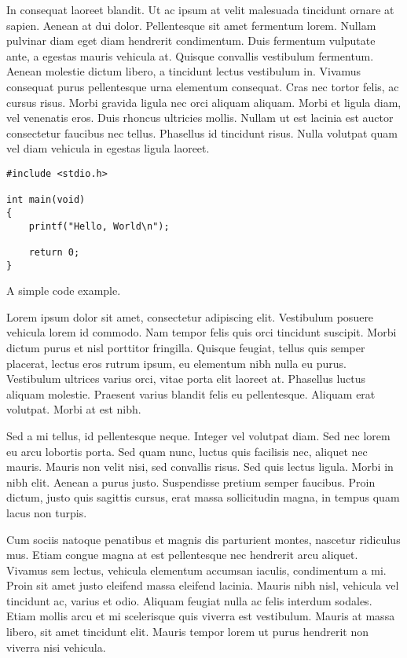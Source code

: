 In consequat laoreet blandit. Ut ac ipsum at velit malesuada tincidunt ornare at sapien. Aenean at dui dolor. Pellentesque sit amet fermentum lorem. Nullam pulvinar diam eget diam hendrerit condimentum. Duis fermentum vulputate ante, a egestas mauris vehicula at. Quisque convallis vestibulum fermentum. Aenean molestie dictum libero, a tincidunt lectus vestibulum in. Vivamus consequat purus pellentesque urna elementum consequat. Cras nec tortor felis, ac cursus risus. Morbi gravida ligula nec orci aliquam aliquam. Morbi et ligula diam, vel venenatis eros. Duis rhoncus ultricies mollis. Nullam ut est lacinia est auctor consectetur faucibus nec tellus. Phasellus id tincidunt risus. Nulla volutpat quam vel diam vehicula in egestas ligula laoreet. 

\begin{listing}[t]
\begin{lstlisting}
#include <stdio.h>

int main(void)
{
	printf("Hello, World\n");

	return 0;
}
\end{lstlisting}
\caption{A simple code example.}
\label{lst:example}
\end{listing}

Lorem ipsum dolor sit amet, consectetur adipiscing elit. Vestibulum posuere vehicula lorem id commodo. Nam tempor felis quis orci tincidunt suscipit. Morbi dictum purus et nisl porttitor fringilla. Quisque feugiat, tellus quis semper placerat, lectus eros rutrum ipsum, eu elementum nibh nulla eu purus. Vestibulum ultrices varius orci, vitae porta elit laoreet at. Phasellus luctus aliquam molestie. Praesent varius blandit felis eu pellentesque. Aliquam erat volutpat. Morbi at est nibh.

Sed a mi tellus, id pellentesque neque. Integer vel volutpat diam. Sed nec lorem eu arcu lobortis porta. Sed quam nunc, luctus quis facilisis nec, aliquet nec mauris. Mauris non velit nisi, sed convallis risus. Sed quis lectus ligula. Morbi in nibh elit. Aenean a purus justo. Suspendisse pretium semper faucibus. Proin dictum, justo quis sagittis cursus, erat massa sollicitudin magna, in tempus quam lacus non turpis.

Cum sociis natoque penatibus et magnis dis parturient montes, nascetur ridiculus mus. Etiam congue magna at est pellentesque nec hendrerit arcu aliquet. Vivamus sem lectus, vehicula elementum accumsan iaculis, condimentum a mi. Proin sit amet justo eleifend massa eleifend lacinia. Mauris nibh nisl, vehicula vel tincidunt ac, varius et odio. Aliquam feugiat nulla ac felis interdum sodales. Etiam mollis arcu et mi scelerisque quis viverra est vestibulum. Mauris at massa libero, sit amet tincidunt elit. Mauris tempor lorem ut purus hendrerit non viverra nisi vehicula.


